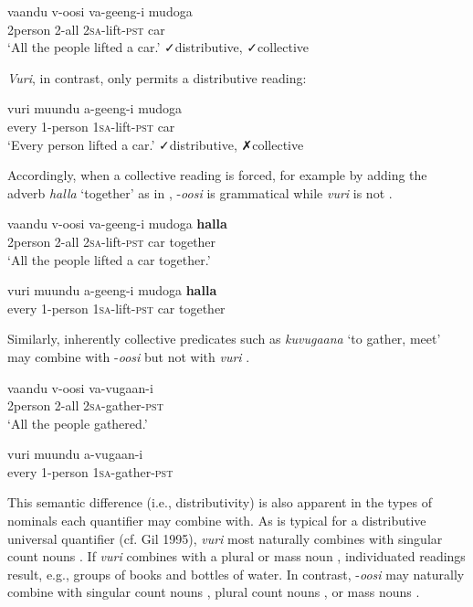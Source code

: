 \documentclass[output=paper]{langsci/langscibook}
\begin{document}
\ea
\gll vaandu  v-oosi    va-geeng-i    mudoga\\
     2person  2-all    2\textsc{sa}{}-lift-\textsc{pst}    car\\
\glt ‘All the people lifted a car.’  ✓distributive, ✓collective
\z

\textit{Vuri}, in contrast, only permits a distributive reading:

\ea
\gll vuri  muundu  a-geeng-i    mudoga\\
     every  1-person  1\textsc{sa}{}-lift-\textsc{pst}    car\\
\glt ‘Every person lifted a car.’  ✓distributive, ✗collective
\z

Accordingly, when a collective reading is forced, for example by adding the adverb \textit{halla} ‘together’ as in , -\textit{oosi} is grammatical  while \textit{vuri} is not .    

\ea 
\gll vaandu    v-oosi  va-geeng-i    mudoga  \textbf{halla}\\
     2person  2-all  2\textsc{sa}{}-lift-\textsc{pst}  car    together\\
\glt ‘All the people lifted a car together.’
\z

\ea
\gll *vuri  muundu  a-geeng-i  mudoga  \textbf{halla}\\
     every  1-person  1\textsc{sa}{}-lift-\textsc{pst}  car    together\\
\z

Similarly, inherently collective predicates such as \textit{kuvugaana} ‘to gather, meet’ may combine with -\textit{oosi}  but not with \textit{vuri} .

\ea
\gll vaandu  v-oosi    va-vugaan-i\\
     2person  2-all    2\textsc{sa}{}-gather-\textsc{pst}  \\
\glt ‘All the people gathered.’
\z

\ea
\gll *vuri  muundu  a-vugaan-i  \\
     every  1-person  1\textsc{sa}{}-gather-\textsc{pst}  \\
\z

  This semantic difference (i.e., distributivity) is also apparent in the types of nominals each quantifier may combine with. As is typical for a distributive universal quantifier (cf. Gil 1995), \textit{vuri} most naturally combines with singular count nouns . If \textit{vuri} combines with a plural  or mass noun , individuated readings result, e.g., groups of books and bottles of water. In contrast, -\textit{oosi} may naturally combine with singular count nouns , plural count nouns , or mass nouns .
\end{document}
